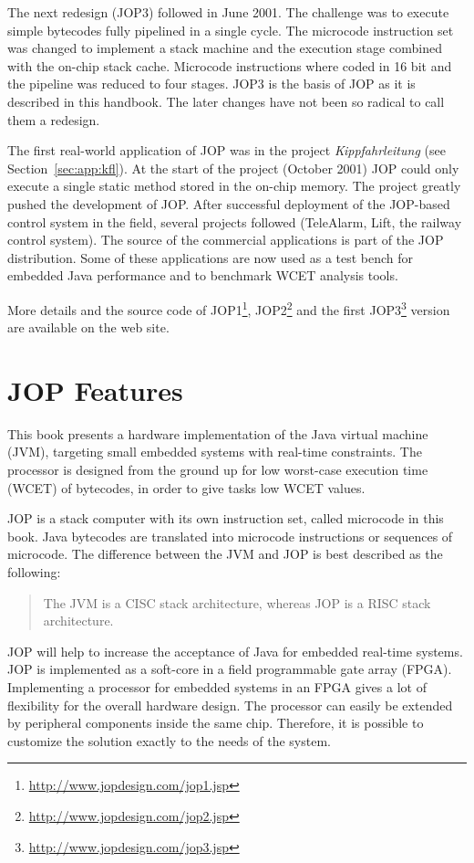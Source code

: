 The next redesign (JOP3) followed in June 2001. The challenge was to
execute simple bytecodes fully pipelined in a single cycle. The
microcode instruction set was changed to implement a stack machine
and the execution stage combined with the on-chip stack cache.
Microcode instructions where coded in 16 bit and the pipeline was
reduced to four stages. JOP3 is the basis of JOP as it is described
in this handbook. The later changes have not been so radical to call
them a redesign.

The first real-world application of JOP was in the project
\emph{Kippfahrleitung} (see Section~\ref{sec:app:kfl}). At the start
of the project (October 2001) JOP could only execute a single static
method stored in the on-chip memory. The project greatly pushed the
development of JOP. After successful deployment of the JOP-based
control system in the field, several projects followed (TeleAlarm,
Lift, the railway control system). The source of the commercial
applications is part of the JOP distribution. Some of these
applications are now used as a test bench for embedded Java
performance and to benchmark WCET analysis tools.

More details and the source code of
JOP1\footnote{\url{http://www.jopdesign.com/jop1.jsp}},
JOP2\footnote{\url{http://www.jopdesign.com/jop2.jsp}} and the first
JOP3\footnote{\url{http://www.jopdesign.com/jop3.jsp}} version are
available on the web site.


\section{JOP Features}

This book presents a hardware implementation of the Java virtual
machine (JVM), targeting small embedded systems with real-time
constraints. The processor is designed from the ground up for low
worst-case execution time (WCET) of bytecodes, in order to give
tasks low WCET values.

JOP is a stack computer with its own instruction set, called
microcode in this book. Java bytecodes are translated into microcode
instructions or sequences of microcode. The difference between the
JVM and JOP is best described as the following:
\begin{quote}
The JVM is a CISC stack architecture, whereas JOP is a RISC stack
architecture.
\end{quote}

JOP will help to increase the acceptance of Java for embedded
real-time systems. JOP is implemented as a soft-core in a field
programmable gate array (FPGA). Implementing a processor for
embedded systems in an FPGA gives a lot of flexibility for the
overall hardware design. The processor can easily be extended by
peripheral components inside the same chip. Therefore, it is
possible to customize the solution exactly to the needs of the
system.

